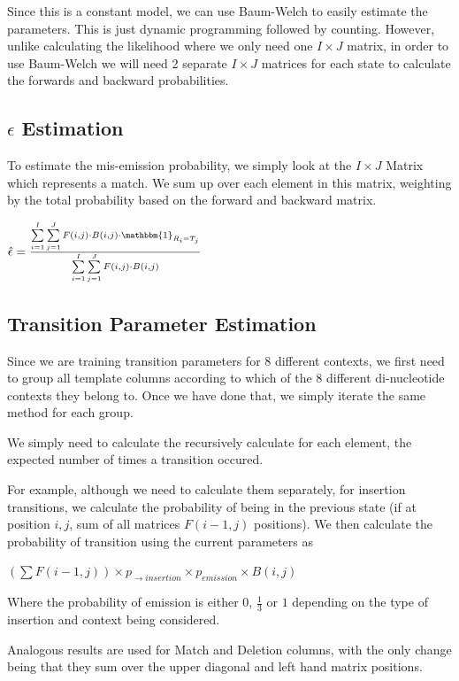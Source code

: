 \documentclass[paper=a4, fontsize=11pt]{scrartcl}
\numberwithin{equation}{section}		%
\numberwithin{figure}{section}			%
\numberwithin{table}{section}				%
\begin{document}
Since this is a constant model, we can use Baum-Welch to easily estimate the parameters.  This is just dynamic programming followed by counting.  However, unlike calculating the likelihood where we only need one $I \times J$ matrix, in order to use Baum-Welch we will need 2 separate $I \times J$ matrices for each state to calculate the forwards and backward probabilities.

\subsection{$\epsilon$ Estimation}

To estimate the mis-emission probability, we simply look at the $I \times J$ Matrix which represents a match.  We sum up over each element in this matrix, weighting by the total probability based on the forward and backward matrix. 
\begin{center}
$\hat{ \epsilon} = \frac{\sum\limits_{i=1}^I \sum\limits_{j=1}^J F(i,j) \cdot B(i,j) \cdot \mathbbm{1}_{R_{i} = T_{j}} }  {\sum\limits_{i=1}^I \sum\limits_{j=1}^J F(i,j) \cdot B(i,j)}$
\end{center}

\subsection{Transition Parameter Estimation}

Since we are training transition parameters for 8 different contexts, we first need to group all template columns according to which of the 8 different di-nucleotide contexts they belong to.  Once we have done that, we simply iterate the same method for each group.

We simply need to calculate the recursively calculate for each element, the expected number of times a transition occured.

For example, although we need to calculate them separately, for insertion transitions, we calculate the probability of being in the previous state (if at position $i,j$, sum of all matrices $F(i-1, j)$ positions).  We then calculate the probability of transition using the current parameters as 

\begin{center}
$(\sum F(i-1, j) )\times p_{\rightarrow insertion} \times p_{emission}  \times B(i, j) $
\end{center}

Where the probability of emission is either $0$, $\frac{1}{3}$ or $1$ depending on the type of insertion and context being considered.


Analogous results are used for Match and Deletion columns, with the only change being that they sum over the upper diagonal and left hand matrix positions. 

 
\end{document}
